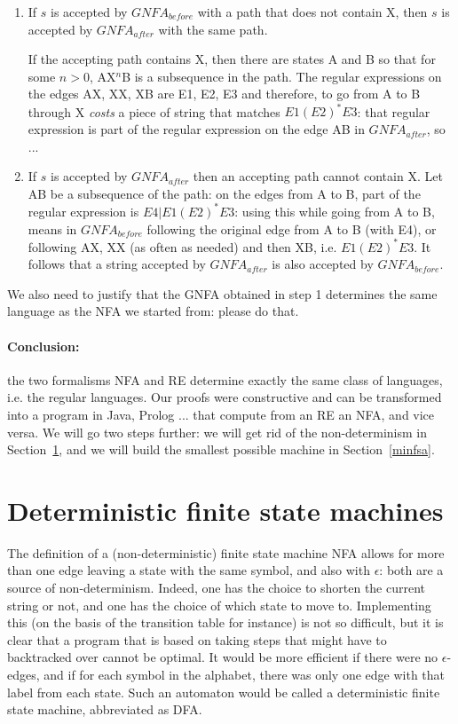 \begin{enumerate}
\item
If $s$ is accepted by $GNFA_{before}$ with a path that does not
contain X, then $s$ is accepted by $GNFA_{after}$ with the same path.

If the accepting path contains X, then there are states A and B so
that for some $n>0$, AX$^n$B is a subsequence in the path. The
regular expressions on the edges AX, XX, XB are E1, E2, E3 and
therefore, to go from A to B through X {\em costs} a piece of string
that matches $E1(E2)^*E3$: that regular expression is part of the
regular expression on the edge AB in $GNFA_{after}$, so ...

\item
If $s$ is accepted by $GNFA_{after}$ then an accepting path cannot
contain X. Let AB be a subsequence of the path: on the edges from A to
B, part of the regular expression is $E4 | E1(E2)^*E3$: using this
while going from A to B, means in $GNFA_{before}$ following the
original edge from A to B (with E4), or following AX, XX (as often as
needed) and then XB, i.e. $E1(E2)^*E3$. It follows that a string
accepted by $GNFA_{after}$ is also accepted by $GNFA_{before}$.

\end{enumerate}

We also need to justify that the GNFA obtained in step 1 determines
the same language as the NFA we started from: please do that.




\paragraph{Conclusion:} the two formalisms NFA and RE determine
exactly the same class of languages, i.e. the regular languages. Our
proofs were constructive and can be transformed into a program in
Java, Prolog ... that compute from an RE an NFA, and vice versa.
We will go two steps further: we will get rid of the non-determinism
in Section~\ref{detfsa}, and we will build the smallest possible
machine in Section~\ref{minfsa}.






\section{Deterministic finite state machines}\label{detfsa}

The definition of a (non-deterministic) finite state machine NFA
allows for more than one edge leaving a state with the same symbol,
and also with $\epsilon$: both are a source of
non-determinism. Indeed, one has the choice to shorten the current
string or not, and one has the choice of which state to
move to. Implementing this (on the basis of the transition table for
instance) is not so difficult, but it is clear that a program that is
based on taking steps that might have to backtracked over cannot be
optimal. It would be more efficient if there were no $\epsilon$-edges,
and if for each symbol in the alphabet, there was only one edge with
that label from each state. Such an automaton would be called a
deterministic finite state machine, abbreviated as DFA.


